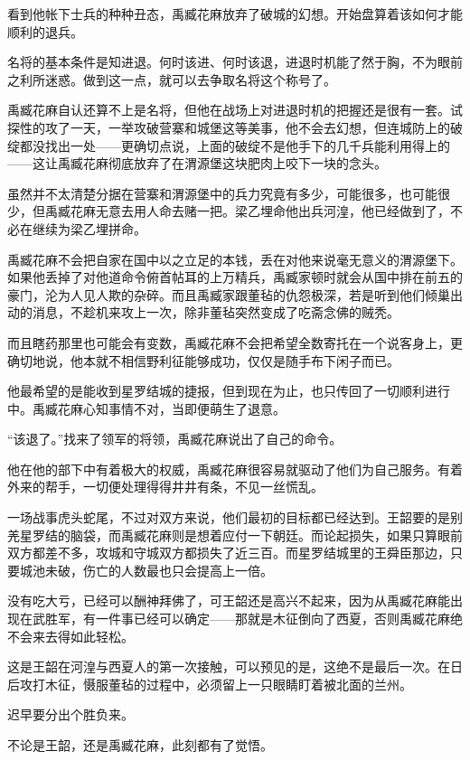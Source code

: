 看到他帐下士兵的种种丑态，禹臧花麻放弃了破城的幻想。开始盘算着该如何才能顺利的退兵。

名将的基本条件是知进退。何时该进、何时该退，进退时机能了然于胸，不为眼前之利所迷惑。做到这一点，就可以去争取名将这个称号了。

禹臧花麻自认还算不上是名将，但他在战场上对进退时机的把握还是很有一套。试探性的攻了一天，一举攻破营寨和城堡这等美事，他不会去幻想，但连城防上的破绽都没找出一处——更确切点说，上面的破绽不是他手下的几千兵能利用得上的——这让禹臧花麻彻底放弃了在渭源堡这块肥肉上咬下一块的念头。

虽然并不太清楚分据在营寨和渭源堡中的兵力究竟有多少，可能很多，也可能很少，但禹臧花麻无意去用人命去赌一把。梁乙埋命他出兵河湟，他已经做到了，不必在继续为梁乙埋拼命。

禹臧花麻不会把自家在国中以之立足的本钱，丢在对他来说毫无意义的渭源堡下。如果他丢掉了对他道命令俯首帖耳的上万精兵，禹臧家顿时就会从国中排在前五的豪门，沦为人见人欺的杂碎。而且禹臧家跟董毡的仇怨极深，若是听到他们倾巢出动的消息，不趁机来攻上一次，除非董毡突然变成了吃斋念佛的贼秃。

而且瞎药那里也可能会有变数，禹臧花麻不会把希望全数寄托在一个说客身上，更确切地说，他本就不相信野利征能够成功，仅仅是随手布下闲子而已。

他最希望的是能收到星罗结城的捷报，但到现在为止，也只传回了一切顺利进行中。禹臧花麻心知事情不对，当即便萌生了退意。

“该退了。”找来了领军的将领，禹臧花麻说出了自己的命令。

他在他的部下中有着极大的权威，禹臧花麻很容易就驱动了他们为自己服务。有着外来的帮手，一切便处理得得井井有条，不见一丝慌乱。

一场战事虎头蛇尾，不过对双方来说，他们最初的目标都已经达到。王韶要的是别羌星罗结的脑袋，而禹臧花麻则是想着应付一下朝廷。而论起损失，如果只算眼前双方都差不多，攻城和守城双方都损失了近三百。而星罗结城里的王舜臣那边，只要城池未破，伤亡的人数最也只会提高上一倍。

没有吃大亏，已经可以酬神拜佛了，可王韶还是高兴不起来，因为从禹臧花麻能出现在武胜军，有一件事已经可以确定——那就是木征倒向了西夏，否则禹臧花麻绝不会来去得如此轻松。

这是王韶在河湟与西夏人的第一次接触，可以预见的是，这绝不是最后一次。在日后攻打木征，慑服董毡的过程中，必须留上一只眼睛盯着被北面的兰州。

迟早要分出个胜负来。

不论是王韶，还是禹臧花麻，此刻都有了觉悟。

